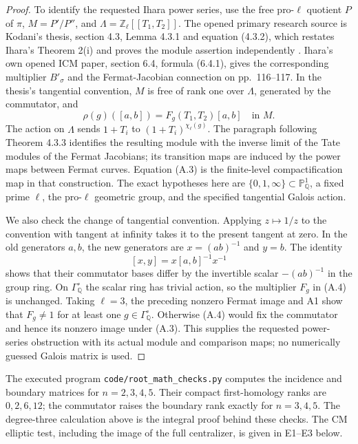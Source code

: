 \documentclass[11pt,a4paper]{article}
\begin{document}
\begin{proof}
To identify the requested Ihara power series, use the free pro-$\ell$ quotient $P$ of $\pi$, $M=P'/P''$, and $\Lambda=\mathbb Z_\ell[[T_1,T_2]]$. The opened primary research source is Kodani's thesis, section 4.3, Lemma 4.3.1 and equation (4.3.2), which restates Ihara's Theorem 2(i) and proves the module assertion independently \cite{Kodani2017,Ihara1991}. Ihara's own opened ICM paper, section 6.4, formula (6.4.1), gives the corresponding multiplier $B'_\sigma$ and the Fermat-Jacobian connection on pp.~116--117. In the thesis's tangential convention, $M$ is free of rank one over $\Lambda$, generated by the commutator, and
\[
 \rho(g)([a,b])=F_g(T_1,T_2)[a,b]\quad\text{in }M.
 \tag{A.4}
\]
The action on $\Lambda$ sends $1+T_i$ to $(1+T_i)^{\chi_\ell(g)}$. The paragraph following Theorem 4.3.3 identifies the resulting module with the inverse limit of the Tate modules of the Fermat Jacobians; its transition maps are induced by the power maps between Fermat curves. Equation (A.3) is the finite-level compactification map in that construction. The exact hypotheses here are $\{0,1,\infty\}\subset\mathbb P^1_{\mathbb Q}$, a fixed prime $\ell$, the pro-$\ell$ geometric group, and the specified tangential Galois action.

We also check the change of tangential convention. Applying $z\mapsto1/z$ to the convention with tangent at infinity takes it to the present tangent at zero. In the old generators $a,b$, the new generators are $x=(ab)^{-1}$ and $y=b$. The identity
\[
 [x,y]=x[a,b]^{-1}x^{-1}
\]
shows that their commutator bases differ by the invertible scalar $-(ab)^{-1}$ in the group ring. On $\Gamma_{\mathbb Q}^{\circ}$ the scalar ring has trivial action, so the multiplier $F_g$ in (A.4) is unchanged. Taking $\ell=3$, the preceding nonzero Fermat image and A1 show that $F_g\ne1$ for at least one $g\in\Gamma_{\mathbb Q}^{\circ}$. Otherwise (A.4) would fix the commutator and hence its nonzero image under (A.3). This supplies the requested power-series obstruction with its actual module and comparison maps; no numerically guessed Galois matrix is used.
\end{proof}

The executed program \texttt{code/root\_math\_checks.py} computes the incidence and boundary matrices for $n=2,3,4,5$. Their compact first-homology ranks are $0,2,6,12$; the commutator raises the boundary rank exactly for $n=3,4,5$. The degree-three calculation above is the integral proof behind these checks. The CM elliptic test, including the image of the full centralizer, is given in E1--E3 below.
\end{document}
